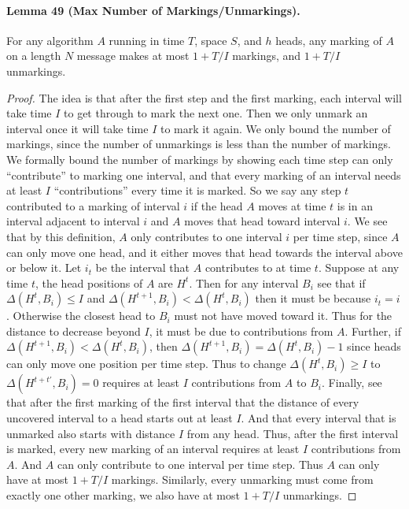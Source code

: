 \documentclass[10pt,a4paper]{article}
\begin{document}
\paragraph{Lemma 49 (Max Number of Markings/Unmarkings).} For any algorithm $A$ running in time $T$, space $S$, and $h$ heads, any marking of $A$ on a length $N$ message makes at most $1+T/I$ markings, and $1+T/I$ unmarkings.
\begin{proof}
The idea is that after the first step and the first marking, each interval will take time $I$ to get through to mark the next one. Then we only unmark an interval once it will take time $I$ to mark it again.
We only bound the number of markings, since the number of unmarkings is less than the number of markings.
We formally bound the number of markings by showing each time step can only ``contribute'' to marking one interval, and that every marking of an interval needs at least $I$ ``contributions'' every time it is marked.
So we say any step $t$ contributed to a marking of interval $i$ if the head $A$ moves at time $t$ is in an interval adjacent to interval $i$ and $A$ moves that head toward interval $i$. We see that by this definition, $A$ only contributes to one interval $i$ per time step, since $A$ can only move one head, and it either moves that head towards the interval above or below it. Let $i_t$ be the interval that $A$ contributes to at time $t$.
Suppose at any time $t$, the head positions of $A$ are $H^t$. Then for any interval $B_i$ see that if $\Delta(H^t,B_i)\le I$ and $\Delta(H^{t+1},B_i)<\Delta(H^t,B_i)$ then it must be because $i_t=i$. Otherwise the closest head to $B_i$ must not have moved toward it. Thus for the distance to decrease beyond $I$, it must be due to contributions from $A$.
Further, if $\Delta(H^{t+1},B_i)<\Delta(H^t,B_i)$, then $\Delta(H^{t+1},B_i)=\Delta(H^t,B_i)-1$ since heads can only move one position per time step. Thus to change $\Delta(H^t,B_i)\ge I$ to $\Delta(H^{t+t'},B_i)=0$ requires at least $I$ contributions from $A$ to $B_i$.
Finally, see that after the first marking of the first interval that the distance of every uncovered interval to a head starts out at least $I$. And that every interval that is unmarked also starts with distance $I$ from any head.
Thus, after the first interval is marked, every new marking of an interval requires at least $I$ contributions from $A$. And $A$ can only contribute to one interval per time step. Thus $A$ can only have at most $1+T/I$ markings. Similarly, every unmarking must come from exactly one other marking, we also have at most $1+T/I$ unmarkings.
\end{proof}
\end{document}
